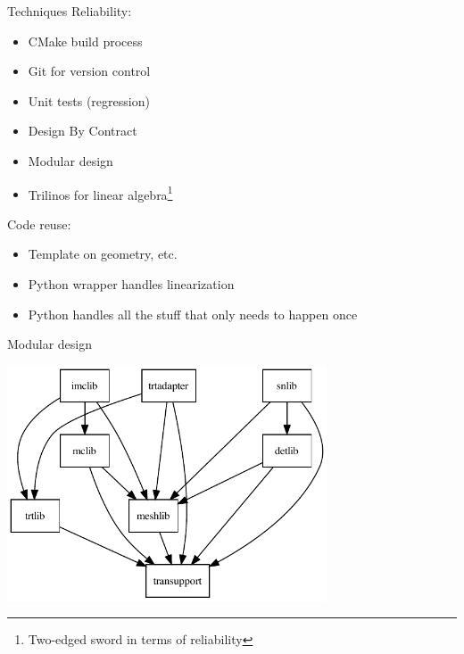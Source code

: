 \documentclass{beamer}
\begin{document}
\begin{frame}{Techniques}
Reliability:
\begin{itemize}
  \item CMake build process
  \item Git for version control
  \item Unit tests (regression)
  \item Design By Contract
  \item Modular design
  \item Trilinos for linear algebra\footnote{Two-edged sword in terms of
    reliability}
\end{itemize}

Code reuse:
\begin{itemize}
  \item Template on geometry, etc.
  \item Python wrapper handles linearization
  \item Python handles all the stuff that only needs to happen once
\end{itemize}
  
\end{frame}

\begin{frame}{Modular design}

{\centering\includegraphics[height=2.75in]{hierarchy}\par}

\end{frame}

\end{document}

